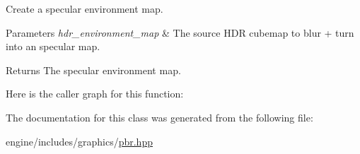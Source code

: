 Create a specular environment map. 


\begin{DoxyParams}{Parameters}
{\em hdr\+\_\+environment\+\_\+map} & The source H\+DR cubemap to blur + turn into an specular map. \\
\hline
\end{DoxyParams}
\begin{DoxyReturn}{Returns}
The specular environment map. 
\end{DoxyReturn}
Here is the caller graph for this function\+:


The documentation for this class was generated from the following file\+:\begin{DoxyCompactItemize}
\item 
engine/includes/graphics/\mbox{\hyperlink{pbr_8hpp}{pbr.\+hpp}}\end{DoxyCompactItemize}
